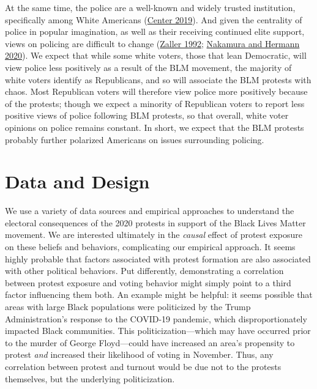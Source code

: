 \documentclass[
  12pt,
]{article}
\begin{document}
At the same time, the police are a well-known and widely trusted institution, specifically among White Americans (\protect\hyperlink{ref-PewResearchCenter2019}{Center 2019}). And given the centrality of police in popular imagination, as well as their receiving continued elite support, views on policing are difficult to change (\protect\hyperlink{ref-Zaller1992}{Zaller 1992}; \protect\hyperlink{ref-Nakamura2020}{Nakamura and Hermann 2020}). We expect that while some white voters, those that lean Democratic, will view police less positively as a result of the BLM movement, the majority of white voters identify as Republicans, and so will associate the BLM protests with chaos. Most Republican voters will therefore view police more positively because of the protests; though we expect a minority of Republican voters to report less positive views of police following BLM protests, so that overall, white voter opinions on police remains constant. In short, we expect that the BLM protests probably further polarized Americans on issues surrounding policing.

\hypertarget{data-and-design}{%
\section*{Data and Design}\label{data-and-design}}

We use a variety of data sources and empirical approaches to understand the electoral consequences of the 2020 protests in support of the Black Lives Matter movement. We are interested ultimately in the \emph{causal} effect of protest exposure on these beliefs and behaviors, complicating our empirical approach. It seems highly probable that factors associated with protest formation are also associated with other political behaviors. Put differently, demonstrating a correlation between protest exposure and voting behavior might simply point to a third factor influencing them both. An example might be helpful: it seems possible that areas with large Black populations were politicized by the Trump Administration's response to the COVID-19 pandemic, which disproportionately impacted Black communities. This politicization---which may have occurred prior to the murder of George Floyd---could have increased an area's propensity to protest \emph{and} increased their likelihood of voting in November. Thus, any correlation between protest and turnout would be due not to the protests themselves, but the underlying politicization.
\end{document}
